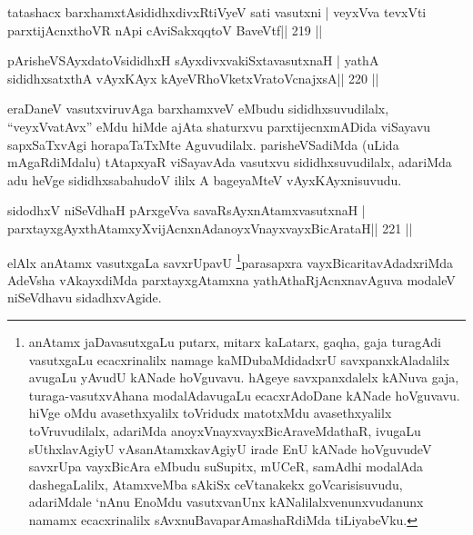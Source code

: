
\begin{shl}
tatashacx barxhamxtAsididhxdivxRtiVyeV sati vasutxni |
veyxVva tevxVti parxtijAcnxthoVR nApi cA\s\s viSakxqqtoV BaveVtf\hfill || 219 ||
\end{shl}

\begin{shl}
pArisheVSAyxdatoV\s sididhxH sAyxdivxvakiSxtavasutxnaH |
yathA sididhxsatxthA vAyxKAyx kAyeVRhoVketxVratoV\s cnajxsA\hfill || 220 ||
\end{shl}


\begin{artha}
eraDaneV vasutxviruvAga barxhamxveV eMbudu sididhxsuvudilalx, ``veyxVvatAvx'' eMdu hiMde ajAta shaturxvu parxtijecnxmADida viSayavu sapxSaTxvAgi horapaTaTxMte Aguvudilalx. parisheVSadiMda (uLida mAgaRdiMdalu) tAtapxyaR viSayavAda vasutxvu sididhxsuvudilalx, adariMda adu heVge sididhxsabahudoV ililx A bageyaMteV vAyxKAyxnisuvudu.
\end{artha}

\begin{shl}
sidodhxV niSeVdhaH pArxgeVva savaRsAyxnAtamxvasutxnaH |
parxtayxgAyxthAtamxyXvijAcnxnAdanoyxVnayxvayxBicArataH\hfill || 221 ||
\end{shl}

\begin{artha}
elAlx anAtamx vasutxgaLa savxrUpavU \footnote{anAtamx
  jaDavasutxgaLu putarx, mitarx kaLatarx, gaqha, gaja turagAdi vasutxgaLu
  ecacxrinalilx namage kaMDubaMdidadxrU savxpanxkAladalilx avugaLu
  yAvudU kANade hoVguvavu. hAgeye savxpanxdalelx kANuva gaja,
  turaga-vasutxvAhana modalAdavugaLu ecacxrAdoDane kANade hoVguvavu.
  hiVge oMdu avasethxyalilx toVridudx matotxMdu avasethxyalilx
  toVruvudilalx, adariMda anoyxVnayxvayxBicAraveMdathaR,
  ivugaLu sUthxlavAgiyU vAsanAtamxkavAgiyU irade EnU kANade hoVguvudeV
  savxrUpa \-vayxBicAra eMbudu suSupitx, mUCeR, samAdhi modalAda
  dashegaLalilx, AtamxveMba sAkiSx ceVtanakekx goVcarisisuvudu,
  adariMdale `nAnu EnoMdu vasutxvanUnx kANalilalxvenunxvudanunx namamx
  ecacxrinalilx sAvxnuBavaparAmashaRdiMda tiLiyabeVku.}parasapxra
vayxBicaritavAdadxriMda AdeVsha vAkayxdiMda parxtayxgAtamxna
yathAthaRjAcnxnavAguva modaleV niSeVdhavu sidadhxvAgide.
\end{artha}

